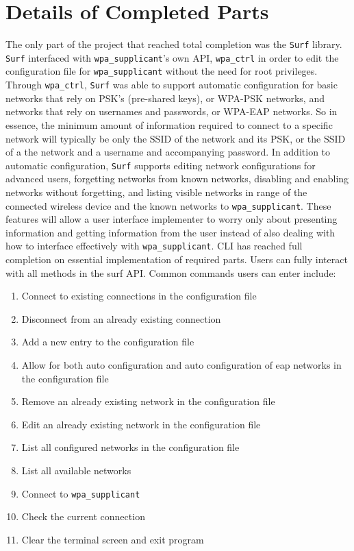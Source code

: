 \documentclass[11pt]{article}
\begin{document}
\section*{Details of Completed Parts}
The only part of the project that reached total completion was the 
\texttt{Surf} library.
\texttt{Surf} interfaced with \texttt{wpa\_supplicant}'s own API, \texttt{wpa\_ctrl}
in order to edit the configuration file for \texttt{wpa\_supplicant} without the need
for root privileges.
Through \texttt{wpa\_ctrl}, \texttt{Surf} was able to support automatic configuration
for basic networks that rely on PSK's (pre-shared keys), or WPA-PSK networks,
and networks that rely on usernames and passwords, or WPA-EAP networks.
So in essence, the minimum amount of information required to connect to a specific 
network will typically be only the SSID of the network and its PSK, or the SSID
of a the network and a username and accompanying password.
In addition to automatic configuration, \texttt{Surf} supports editing network
configurations for advanced users, forgetting networks from known networks,
disabling and enabling networks without forgetting, and listing visible networks
in range of the connected wireless device and the known networks to \texttt{wpa\_supplicant}.
These features will allow a user interface implementer to worry only about presenting
information and getting information from the user instead of also dealing with
how to interface effectively with \texttt{wpa\_supplicant}. 
CLI has reached full completion on essential implementation of required parts. Users can 
fully interact with all methods in the surf API. Common commands users can enter include:
\begin{enumerate}
\item Connect to existing connections in the configuration file
\item Disconnect from an already existing connection
\item Add a new entry to the configuration file
\item Allow for both auto configuration and auto configuration of eap networks in the configuration file
\item Remove an already existing network in the configuration file
\item Edit an already existing network in the configuration file
\item List all configured networks in the configuration file
\item List all available networks
\item Connect to \texttt{wpa\_supplicant}
\item Check the current connection
\item Clear the terminal screen and exit program
\end{enumerate}
\end{document}

